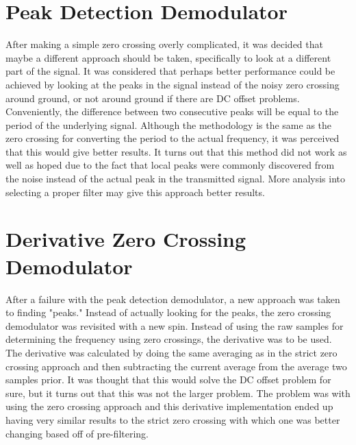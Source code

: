 \section{Peak Detection Demodulator}
After making a simple zero crossing overly complicated, it was decided that maybe a different approach should be taken, specifically to look at a different part of the signal. It was considered that perhaps better performance could be achieved by looking at the peaks in the signal instead of the noisy zero crossing around ground, or not around ground if there are DC offset problems. Conveniently, the difference between two consecutive peaks will be equal to the period of the underlying signal. Although the methodology is the same as the zero crossing for converting the period to the actual frequency, it was perceived that this would give better results. It turns out that this method did not work as well as hoped due to the fact that local peaks were commonly discovered from the noise instead of the actual peak in the transmitted signal. More analysis into selecting a proper filter may give this approach better results.

\section{Derivative Zero Crossing Demodulator}
After a failure with the peak detection demodulator, a new approach was taken to finding "peaks." Instead of actually looking for the peaks, the zero crossing demodulator was revisited with a new spin. Instead of using the raw samples for determining the frequency using zero crossings, the derivative was to be used. The derivative was calculated by doing the same averaging as in the strict zero crossing approach and then subtracting the current average from the average two samples prior. It was thought that this would solve the DC offset problem for sure, but it turns out that this was not the larger problem. The problem was with using the zero crossing approach and this derivative implementation ended up having very similar results to the strict zero crossing with which one was better changing based off of pre-filtering.

